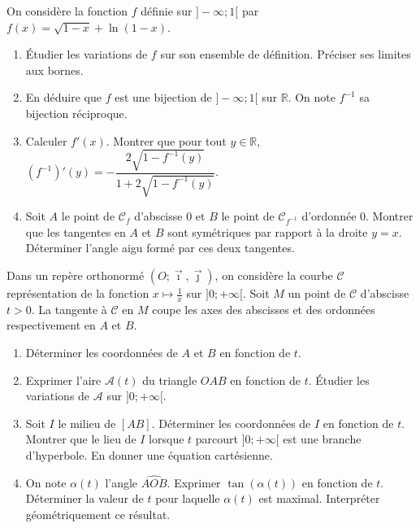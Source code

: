 \documentclass[11pt]{article}
\begin{document}
\begin{exercice}
On considère la fonction $f$ définie sur $]-\infty; 1[$ par $f(x) = \sqrt{1-x} + \ln(1-x)$.
\begin{enumerate}
    \item Étudier les variations de $f$ sur son ensemble de définition. Préciser ses limites aux bornes.
    \item En déduire que $f$ est une bijection de $]-\infty; 1[$ sur $\mathbb{R}$. On note $f^{-1}$ sa bijection réciproque.
    \item Calculer $f'(x)$. Montrer que pour tout $y \in \mathbb{R}$, $(f^{-1})'(y) = -\dfrac{2\sqrt{1-f^{-1}(y)}}{1+2\sqrt{1-f^{-1}(y)}}$.
    \item Soit $A$ le point de $\mathcal{C}_f$ d'abscisse $0$ et $B$ le point de $\mathcal{C}_{f^{-1}}$ d'ordonnée $0$. Montrer que les tangentes en $A$ et $B$ sont symétriques par rapport à la droite $y=x$. Déterminer l'angle aigu formé par ces deux tangentes.
\end{enumerate}
\end{exercice}

\begin{exercice}
Dans un repère orthonormé $(O;\vec{\imath},\vec{\jmath})$, on considère la courbe $\mathcal{C}$ représentation de la fonction $x \mapsto \frac{1}{x}$ sur $]0; +\infty[$. Soit $M$ un point de $\mathcal{C}$ d'abscisse $t > 0$. La tangente à $\mathcal{C}$ en $M$ coupe les axes des abscisses et des ordonnées respectivement en $A$ et $B$.
\begin{enumerate}
    \item Déterminer les coordonnées de $A$ et $B$ en fonction de $t$.
    \item Exprimer l'aire $\mathcal{A}(t)$ du triangle $OAB$ en fonction de $t$. Étudier les variations de $\mathcal{A}$ sur $]0; +\infty[$.
    \item Soit $I$ le milieu de $[AB]$. Déterminer les coordonnées de $I$ en fonction de $t$. Montrer que le lieu de $I$ lorsque $t$ parcourt $]0; +\infty[$ est une branche d'hyperbole. En donner une équation cartésienne.
    \item On note $\alpha(t)$ l'angle $\widehat{AOB}$. Exprimer $\tan(\alpha(t))$ en fonction de $t$. Déterminer la valeur de $t$ pour laquelle $\alpha(t)$ est maximal. Interpréter géométriquement ce résultat.
\end{enumerate}
\end{exercice}
\end{document}
